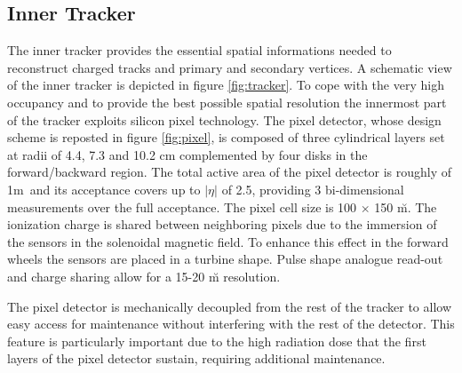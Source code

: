 \subsection{Inner Tracker}

The inner tracker provides the essential spatial informations needed to reconstruct charged tracks and primary and secondary vertices. A schematic view of the inner tracker is depicted in figure \ref{fig:tracker}. To cope with the very high occupancy and to provide the best possible spatial resolution the innermost part of the tracker exploits silicon pixel technology. The pixel detector, whose design scheme is reposted in figure \ref{fig:pixel}, is composed of three cylindrical layers set at radii of 4.4, 7.3 and 10.2 cm complemented by four disks  in the forward/backward region. The total active area of the pixel detector is roughly of 1m\sq~and its acceptance covers up to $|\eta|$ of 2.5, providing 3 bi-dimensional measurements over the full acceptance. The pixel cell size is 100 $\times$ 150 \u m\sq. The ionization charge is shared between neighboring pixels due to the immersion of the sensors in the solenoidal magnetic field. To enhance this effect in the forward wheels the sensors are placed in a turbine shape. Pulse shape analogue read-out and charge sharing allow for a 15-20 \u m resolution. 

The pixel detector is mechanically decoupled from the rest of the tracker to allow easy access for maintenance without interfering with the rest of the detector. This feature is particularly important due to the high radiation dose that the first layers of the pixel detector sustain, requiring additional maintenance.

